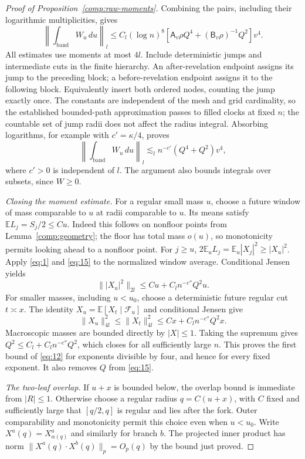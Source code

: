 \begin{proof}[Proof of Proposition~\ref{comp:raw-moments}]
Combining the pairs, including their logarithmic multiplicities, gives
\[
 \left\|\int_{\mathrm{band}}W_u\,du\right\|_l
 \le C_l(\log n)^8
       \left[\mathsf A_v\rho Q^4+(\mathsf B_v\rho)^{-1}Q^2\right]v^4.
\]
All estimates use moments at most $4l$.  Include deterministic jumps
and intermediate cuts in the finite hierarchy.  An after-revelation
endpoint assigns its jump to the preceding block; a before-revelation
endpoint assigns it to the following block.  Equivalently insert both
ordered nodes, counting the jump exactly once.  The constants are independent of the
mesh and grid cardinality, so the established bounded-path approximation
passes to filled clocks at fixed $n$; the countable set of jump radii
does not affect the radius integral.  Absorbing logarithms, for example
with $c'=\kappa/4$, proves
\begin{equation}
 \left\|\int_{\mathrm{band}}W_u\,du\right\|_l
 \lesssim_l n^{-c'}(Q^4+Q^2)v^4,
 \tag{15}\label{eq:15}
\end{equation}
where $c'>0$ is independent of $l$.  The argument also bounds integrals
over subsets, since $W\ge0$.

\emph{Closing the moment estimate.}
For a regular small mass $u$, choose a future window of mass comparable
to $u$ at radii comparable to $u$.  Its means satisfy
$\mathbb EL_j=S_j/2\le Cu$.  Indeed this follows on nonfloor points
from Lemma~\ref{comp:geometry}; the floor has total mass $o(u)$, so
monotonicity permits looking ahead to a nonfloor point.  For $j\ge u$,
$2\mathbb E_uL_j=\mathbb E_u|X_j|^2\ge|X_u|^2$.
Apply \eqref{eq:1} and \eqref{eq:15} to the normalized window average.
Conditional Jensen yields
\[
 \||X_u|^2\|_{2l}\le Cu+C_l n^{-c''}Q^2u.
\]
For smaller masses, including $u<u_0$, choose a deterministic future
regular cut $t\asymp x$.  The identity
$X_u=\mathbb E[X_t\mid\mathcal F_u]$ and conditional Jensen give
\[
 \|X_u\|_{4l}^2\le\|X_t\|_{4l}^2
                    \le Cx+C_l n^{-c''}Q^2x.
\]
Macroscopic masses are bounded directly by $|X|\le1$.
Taking the supremum gives $Q^2\le C_l+C_l n^{-c''}Q^2$, which closes
for all sufficiently large $n$.  This proves the first bound of
\eqref{eq:12} for exponents divisible by four, and hence for every
fixed exponent.  It also removes $Q$ from \eqref{eq:15}.

\emph{The two-leaf overlap.}
If $u+x$ is bounded below, the overlap bound is immediate from $|R|\le1$.
Otherwise choose a regular radius $q=C(u+x)$, with $C$ fixed and
sufficiently large that $[q/2,q]$ is regular and lies after the fork.
Outer comparability and monotonicity permit this choice even when
$u<u_0$.  Write $X^a(q)=X^a_{\alpha(q)}$ and similarly for branch $b$.
The projected inner product has norm
$\|X^a(q)\cdot X^b(q)\|_p=O_p(q)$ by the bound just proved.


\end{proof}
